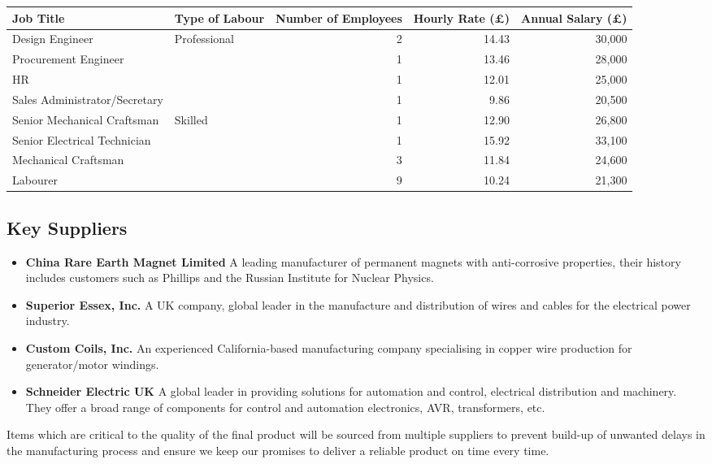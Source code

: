\documentclass[a4paper,11pt]{article}
\begin{document}
\begin{flushleft}
\begin{tabular}{p{2cm} | l | r r r}
Job Title & Type of Labour & \parbox[t]{2cm}{Number of Employees} & Hourly Rate (£) & Annual Salary (£) \\
\hline
Design Engineer & Professional & 2 & 14.43 & 30,000 \\
Procurement Engineer & & 1 & 13.46 & 28,000 \\
HR & & 1 & 12.01 & 25,000 \\
Sales Administrator/Secretary & & 1 & 9.86 & 20,500 \\
\hline
Senior Mechanical Craftsman & Skilled & 1 & 12.90 & 26,800 \\
Senior Electrical Technician & & 1 & 15.92 & 33,100 \\
Mechanical Craftsman & & 3 & 11.84 & 24,600 \\
Labourer & & 9 & 10.24 & 21,300 \\
\end{tabular}
\end{flushleft}

\subsection{Key Suppliers}
\begin{itemize}
	\item \textbf{China Rare Earth Magnet Limited} A leading manufacturer of permanent magnets with anti-corrosive properties, their history includes customers such as Phillips and the Russian Institute for Nuclear Physics\cite{d7}.
	\item \textbf{Superior Essex, Inc.} A UK company, global leader in the manufacture and distribution of wires and cables for the electrical power industry\cite{d8}.
	\item \textbf{Custom Coils, Inc.} An experienced California-based manufacturing company specialising in copper wire production for generator/motor windings\cite{d9}.
	\item \textbf{Schneider Electric UK} A global leader in providing solutions for automation and control, electrical distribution and machinery. They offer a broad range of components for control and automation electronics, AVR, transformers, etc.\cite{d10}
\end{itemize}

Items which are critical to the quality of the final product will be sourced from multiple suppliers to prevent build-up of unwanted delays in the manufacturing process and ensure we keep our promises to deliver a reliable product on time every time.
\end{document}
